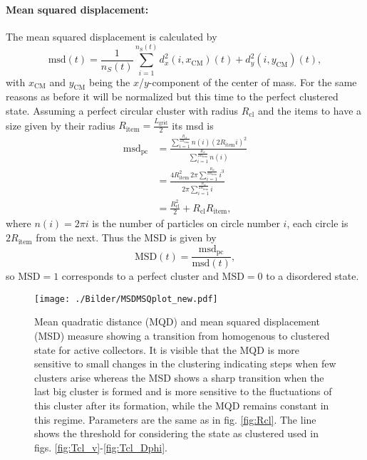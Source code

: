 \paragraph{Mean squared displacement:} The mean squared displacement is calculated by
%
\begin{equation}
	\text{msd}(t) = \frac{1}{n_S(t)}\sum_{i=1}^{n_S(t)}d_x^2(i,x_\text{CM})(t)+d_y^2(i,y_\text{CM})(t),
\label{eq:msd}
\end{equation}
%
with $x_\text{CM}$ and $y_\text{CM}$ being the $x$/$y$-component of the center of mass. For the same reasons as before it will be normalized but this time to the perfect clustered state. Assuming a perfect circular cluster with radius $R_\text{cl}$ and the items to have a size given by their radius $R_\text{item}=\frac{L_\text{grid}}{2}$ its msd is
%
\begin{align}
	\nonumber \text{msd}_\text{pc} &= \frac{\sum_{i=1}^{\frac{R_\text{cl}}{2R_\text{item}}}n(i)\left(2R_\text{item}i\right)^2}{\sum_{i=1}^{\frac{R_\text{cl}}{2R_\text{item}}}n(i)} \\
	\nonumber &= \frac{4R_\text{item}^2\,2\pi\sum_{i=1}^{\frac{R_\text{cl}}{2R_\text{item}}}i^3}{2\pi\sum_{i=1}^{\frac{R_\text{cl}}{2R_\text{item}}}i} \\
	&= \frac{R_\text{cl}^2}{2}+R_\text{cl}R_\text{item},
\label{eq:msdpc}
\end{align}
%
where $n(i)=2\pi i$ is the number of particles on circle number $i$, each circle is $2R_\text{item}$ from the next.
Thus the MSD is given by
%
\begin{equation}
	\text{MSD}(t) = \frac{\text{msd}_\text{pc}}{\text{msd}(t)},
\end{equation}
%
so $\text{MSD}=1$ corresponds to a perfect cluster and $\text{MSD}=0$ to a disordered state.
%
\begin{figure}[H]
\centering
  \texttt{[image: ./Bilder/MSDMSQplot\_new.pdf]}
\caption{Mean quadratic distance (MQD) and mean squared displacement (MSD) measure showing a transition from homogenous to clustered state for active collectors. It is visible that the MQD is more sensitive to small changes in the clustering indicating steps when few clusters arise whereas the MSD shows a sharp transition when the last big cluster is formed and is more sensitive to the fluctuations of this cluster after its formation, while the MQD remains constant in this regime. Parameters are the same as in fig. \ref{fig:Rcl}. The line shows the threshold for considering the state as clustered used in figs. \ref{fig:Tcl_v}-\ref{fig:Tcl_Dphi}.}
\label{fig:MQDMSD}
\end{figure}
%

